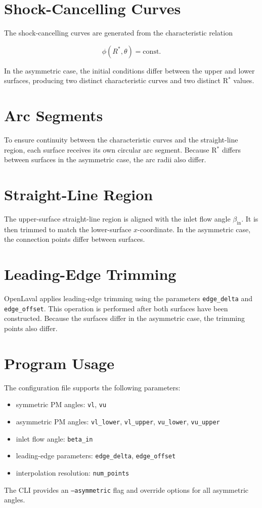 \section{Shock-Cancelling Curves}

The shock-cancelling curves are generated from the characteristic relation


\[
\phi(R^\ast, \theta) = \mathrm{const.}
\]



In the asymmetric case, the initial conditions differ between the upper and
lower surfaces, producing two distinct characteristic curves and two distinct
R$^\ast$ values.

\section{Arc Segments}

To ensure continuity between the characteristic curves and the straight-line
region, each surface receives its own circular arc segment.
Because R$^\ast$ differs between surfaces in the asymmetric case,
the arc radii also differ.

\section{Straight-Line Region}

The upper-surface straight-line region is aligned with the inlet flow angle
$\beta_{\mathrm{in}}$.
It is then trimmed to match the lower-surface $x$-coordinate.
In the asymmetric case, the connection points differ between surfaces.

\section{Leading-Edge Trimming}

OpenLaval applies leading-edge trimming using the parameters
\texttt{edge\_delta} and \texttt{edge\_offset}.
This operation is performed after both surfaces have been constructed.
Because the surfaces differ in the asymmetric case, the trimming points also differ.

\section{Program Usage}

The configuration file supports the following parameters:

\begin{itemize}
  \item symmetric PM angles: \texttt{vl}, \texttt{vu}
  \item asymmetric PM angles:
        \texttt{vl\_lower}, \texttt{vl\_upper},
        \texttt{vu\_lower}, \texttt{vu\_upper}
  \item inlet flow angle: \texttt{beta\_in}
  \item leading-edge parameters: \texttt{edge\_delta}, \texttt{edge\_offset}
  \item interpolation resolution: \texttt{num\_points}
\end{itemize}

The CLI provides an \texttt{--asymmetric} flag and override options for all
asymmetric angles.
